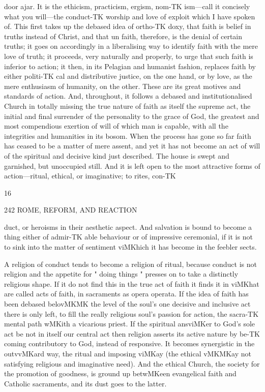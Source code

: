 \documentclass[12pt,a5paper,twoside]{book}
\begin{document}
{door ajar. It is the ethicism, practicism, ergism, nom-TK
ism---call it concisely what you will---the conduct-TK
worship and love of exploit which I have spoken 
of. This first takes up the debased idea of ortho-TK
doxy, that faith is belief in truths instead of Christ, 
and that un faith, therefore, is the denial of certain 
truths; it goes on accordingly in a liberalising way 
to identify faith with the mere love of truth; it 
proceeds, very naturally and properly, to urge that 
such faith is inferior to action; it then, in its Pelagian 
and humanist fashion, replaces faith by either politi-TK
cal and distributive justice, on the one hand, or by 
love, as the mere enthusiasm of humanity, on the 
other. These are its great motives and standards of 
action. And, throughout, it follows a debased and 
institutionalised Church in totally missing the true 
nature of faith as itself the supreme act, the initial 
and final surrender of the personality to the grace of 
God, the greatest and most compendious exertion of 
will of which man is capable, with all the integrities 
and humanities in its bosom. When the process has 
gone so far faith has ceased to be a matter of mere 
assent, and yet it has not become an act of will of 
the spiritual and decisive kind just described. The 
house is swept and garnished, but unoccupied still. 
And it is left open to the most attractive forms of 
action---ritual, ethical, or imaginative; to rites, con-TK

16 



242 ROME, REFORM, AND REACTION 

duct, or heroisms in their aesthetic aspect. And 
salvation is bound to become a thing either of admir-TK
able behaviour or of impressive ceremonial, if it is not 
to sink into the matter of sentiment viMKhich it has 
become in the feebler sects. 

A religion of conduct tends to become a religion of 
ritual, because conduct is not religion and the appetite 
for " doing things " presses on to take a distinctly 
religious shape. If it do not find this in the true act 
of faith it finds it in viMKhat are called acts of faith, in 
sacraments as opera operata. If the idea of faith has 
been debased belovMKMK the level of the soul's one 
decisive and inclusive act there is only left, to fill the 
really religious soul's passion for action, the sacra-TK
mental path wMKith a vicarious priest. If the spiritual 
ansviMKer to God's sole act be not in itself our central 
act then religion asserts its active nature by be-TK
coming contributory to God, instead of responsive. 
It becomes synergistic in the outvvMKard way, the ritual 
and imposing viMKay (the ethical vMKMKay not satisfying 
religious and imaginative need). And the ethical 
Church, the society for the promotion of goodness, 
is ground up betwMKeen evangelical faith and Catholic 
sacraments, and its dust goes to the latter. 



}
\end{document}
